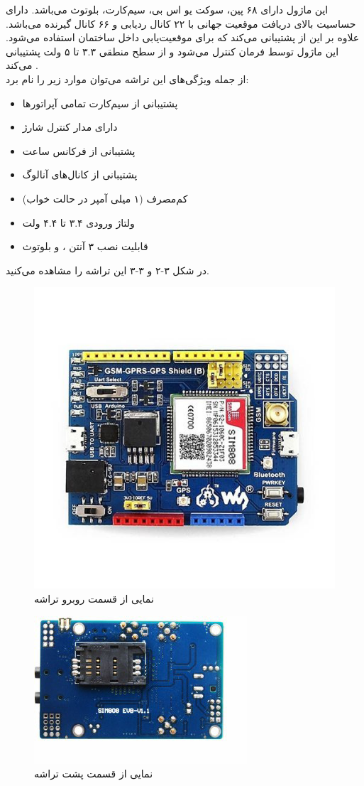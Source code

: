  
 این ماژول دارای ۶۸ پین، سوکت یو اس بی، سیم‌کارت، بلوتوث می‌باشد. دارای حساسیت بالای دریافت موقعیت جهانی با ۲۲ کانال ردیابی و ۶۶ کانال گیرنده می‌باشد. علاوه بر این از  پشتیبانی می‌کند که برای موقعیت‌یابی داخل ساختمان استفاده می‌شود. این ماژول توسط فرمان  کنترل می‌شود و از سطح منطقی ۳.۳ تا ۵ ولت پشتیبانی می‌کند \cite{datasheet}.\\ از جمله ویژگی‌های این تراشه می‌توان موارد زیر را نام برد:
\begin{itemize}
	\item 
	پشتیبانی از سیم‌کارت تمامی آپراتورها
	\item
	دارای مدار کنترل شارژ
	\item
	پشتیبانی از فرکانس ساعت
	\item 
	پشتیبانی از کانال‌های آنالوگ
	\item
	کم‌مصرف (۱ میلی آمپر در حالت خواب)
	\item 
	ولتاژ ورودی ۳.۴ تا ۴.۴ ولت
	\item 
	قابلیت نصب ۳ آنتن ،  و بلوتوث
\end{itemize}
در شکل ۳-۲ و ۳-۳ این تراشه را مشاهده می‌کنید.
\begin{figure}[!h]
	\centerline{\includegraphics[width=.6\textwidth]{sim809}}
	\caption{نمایی از قسمت روبرو تراشه }
\end{figure}
\begin{figure}[!h]
	\centerline{\includegraphics[width=.5\textwidth]{backside-sim808}}
	\caption{نمایی از قسمت پشت تراشه }
\end{figure}


